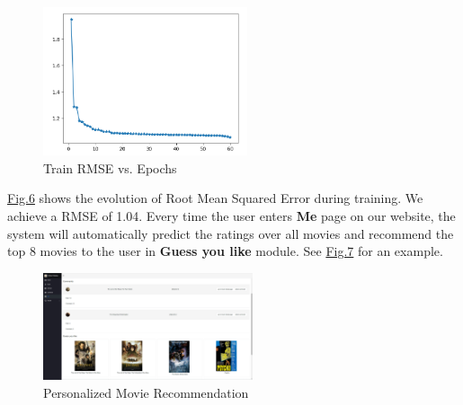 \begin{CJK*}{UTF8}{gbsn}
\begin{figure}[htbp]
\begin{minipage}[t]{0.45\textwidth}
\end{minipage}
\begin{minipage}[t]{0.45\textwidth}
\centering
\includegraphics[width=6cm]{RBMResult.png}
\caption{Train RMSE vs. Epochs}
\end{minipage}
\end{figure}
\hyperref[RBM]{Fig.6} shows the evolution of Root Mean Squared Error during training. We achieve a RMSE of 1.04. Every time the user enters \textbf{Me} page on our website, the system will automatically predict the ratings over all movies and recommend the top 8 movies to the user in \textbf{Guess you like} module. See \hyperref[recommend]{Fig.7} for an example.
\begin{figure}[h]
    \centering
    \label{recommend}
    \includegraphics[width = 0.55\textwidth]{recommendation.png}
    \caption{Personalized Movie Recommendation}
\end{figure}

\end{CJK*}
